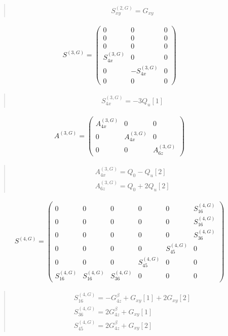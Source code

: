 \documentclass[fleqn,10pt]{jsarticle}
\begin{document}
\begin{quote}
\begin{align*}
& S^{(2,G)}_{xy} = G_{xy}
\end{align*}
\end{quote}
\begin{align*}
S^{(3,G)} = \begin{pmatrix} 0 & 0 & 0 \\ 0 & 0 & 0 \\ 0 & 0 & 0 \\ S^{(3,G)}_{4x} & 0 & 0 \\ 0 & - S^{(3,G)}_{4x} & 0 \\ 0 & 0 & 0 \end{pmatrix}
\end{align*}
\begin{quote}
\begin{align*}
& S^{(3,G)}_{4x} = - 3 Q_{u}[1]
\end{align*}
\end{quote}
\begin{align*}
A^{(3,G)} = \begin{pmatrix} A^{(3,G)}_{4x} & 0 & 0 \\ 0 & A^{(3,G)}_{4x} & 0 \\ 0 & 0 & A^{(3,G)}_{6z} \end{pmatrix}
\end{align*}
\begin{quote}
\begin{align*}
& A^{(3,G)}_{4x} = Q_{0} - Q_{u}[2] \\
& A^{(3,G)}_{6z} = Q_{0} + 2 Q_{u}[2]
\end{align*}
\end{quote}
\begin{align*}
S^{(4,G)} = \begin{pmatrix} 0 & 0 & 0 & 0 & 0 & S^{(4,G)}_{16} \\ 0 & 0 & 0 & 0 & 0 & S^{(4,G)}_{16} \\ 0 & 0 & 0 & 0 & 0 & S^{(4,G)}_{36} \\ 0 & 0 & 0 & 0 & S^{(4,G)}_{45} & 0 \\ 0 & 0 & 0 & S^{(4,G)}_{45} & 0 & 0 \\ S^{(4,G)}_{16} & S^{(4,G)}_{16} & S^{(4,G)}_{36} & 0 & 0 & 0 \end{pmatrix}
\end{align*}
\begin{quote}
\begin{align*}
& S^{(4,G)}_{16} = - G_{4z}^{\beta} + G_{xy}[1] + 2 G_{xy}[2] \\
& S^{(4,G)}_{36} = 2 G_{4z}^{\beta} + G_{xy}[1] \\
& S^{(4,G)}_{45} = 2 G_{4z}^{\beta} + G_{xy}[2]
\end{align*}
\end{quote}
\end{document}
